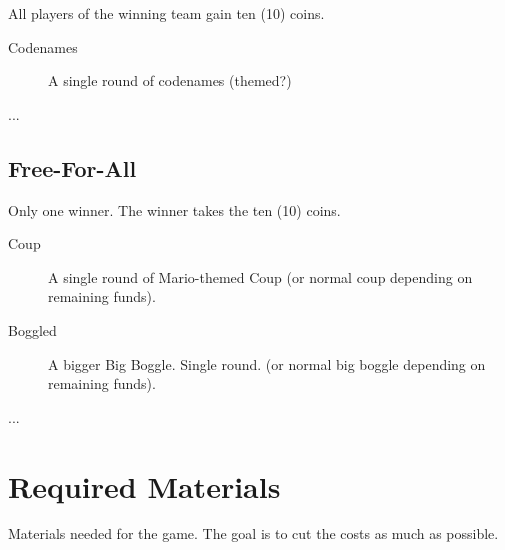 \documentclass{article}
\begin{document}
All players of the winning team gain ten (10) coins.

\begin{description}
\item[Codenames] A single round of codenames (themed?)
\item[...]
\end{description}

\subsection{Free-For-All}

Only one winner.  The winner takes the ten (10) coins.

\begin{description}
\item[Coup] A single round of Mario-themed Coup (or normal coup depending on remaining funds).
\item[Boggled] A bigger Big Boggle.  Single round. (or normal big boggle depending on remaining funds).
\item[...]
\end{description}

\section{Required Materials}

Materials needed for the game.  The goal is to cut the costs as much as possible.
\end{document}
